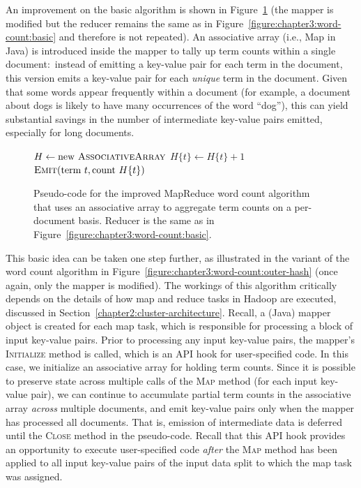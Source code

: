 An improvement on the basic algorithm is shown in
Figure~\ref{figure:chapter3:word-count:inner-hash} (the mapper is
modified but the reducer remains the same as in
Figure~\ref{figure:chapter3:word-count:basic} and therefore is not
repeated).  An associative array (i.e., Map in Java) is introduced
inside the mapper to tally up term counts within a single
document:\ instead of emitting a key-value pair for each term in the
document, this version emits a key-value pair for each \emph{unique}
term in the document.  Given that some words appear frequently within
a document (for example, a document about dogs is likely to have many
occurrences of the word ``dog''), this can yield substantial savings
in the number of intermediate key-value pairs emitted, especially for
long documents.

\begin{figure}[t]
\algrenewcommand{}
\algrenewcommand{}
  \begin{algorithmic}[1]
    \State $H \gets \textrm{new }\textsc{AssociativeArray}$
      \State $H\{t\} \gets H\{t\} + 1$
    \EndFor
    \State $\textsc{Emit}(\textrm{term }t, \textrm{count }H\{t\} )$
    \EndFor
    \EndProcedure
    \EndFunction
  \end{algorithmic}
  \caption{Pseudo-code for the improved MapReduce word count algorithm
    that uses an associative array to aggregate term counts on a
    per-document basis.  Reducer is the same as in
    Figure~\ref{figure:chapter3:word-count:basic}.}
\label{figure:chapter3:word-count:inner-hash}
\end{figure}

This basic idea can be taken one step further, as illustrated in the
variant of the word count algorithm in
Figure~\ref{figure:chapter3:word-count:outer-hash} (once again, only
the mapper is modified).  The workings of this algorithm critically
depends on the details of how map and reduce tasks in Hadoop are
executed, discussed in Section~\ref{chapter2:cluster-architecture}.
Recall, a (Java) mapper object is created for each map task, which is
responsible for processing a block of input key-value pairs.  Prior to
processing any input key-value pairs, the mapper's \textsc{Initialize}
method is called, which is an API hook for user-specified code.  In
this case, we initialize an associative array for holding term counts.
Since it is possible to preserve state across multiple calls of the
\textsc{Map} method (for each input key-value pair), we can continue
to accumulate partial term counts in the associative array \emph{
  across} multiple documents, and emit key-value pairs only when the
mapper has processed all documents.  That is, emission of intermediate
data is deferred until the \textsc{Close} method in the pseudo-code.
Recall that this API hook provides an opportunity to execute
user-specified code \emph{after} the \textsc{Map} method has been
applied to all input key-value pairs of the input data split to which
the map task was assigned.

